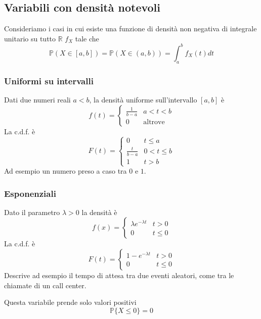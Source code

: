 \subsection{Variabili con densità notevoli}
Consideriamo i casi in cui esiste una funzione di densità non negativa di integrale unitario su tutto $\mathbb{R}$ $f_X$ tale che
\begin{equation}
	\mathbb{P}(X \in [a,b]) = \mathbb{P}(X \in (a,b)) = \int_{a}^{b} f_X(t)dt
\end{equation}

\subsubsection{Uniformi su intervalli}
Dati due numeri reali $a < b$, la densità uniforme sull'intervallo $[a,b]$ è
\begin{equation}
	f(t) = \begin{cases}
		\frac{1}{b-a} & a < t < b\\
		0 & \text{altrove}
	\end{cases}
\end{equation}
La c.d.f. è
\begin{equation}
	F(t)=\begin{cases}
		0 & t \leq a \\
		\frac{t}{b-a} & 0 < t \leq b \\
		1 & t>b
	\end{cases}
\end{equation}
Ad esempio un numero preso a caso tra $0$ e $1$.

\subsubsection{Esponenziali}
Dato il parametro $\lambda>0$ la densità è
\begin{equation}
	f(x)=\begin{cases}
		\lambda e^{-\lambda t} & t >0 \\
		0 & t \leq 0
	\end{cases}
\end{equation}
La c.d.f. è
\begin{equation}
	F(t) = \begin{cases}
		1-e^{-\lambda t} & t>0\\
		0 & t \leq 0
	\end{cases}
\end{equation}
Descrive ad esempio il tempo di attesa tra due eventi aleatori, come tra le chiamate di un call center.
\begin{observation}
	Questa variabile prende solo valori positivi
	\begin{equation*}
		\mathbb{P}\{X \leq 0\}= 0
	\end{equation*}
\end{observation}

